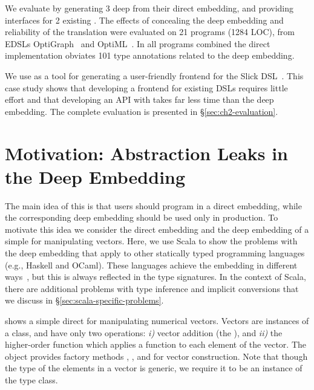 %
%
We evaluate \yy by generating 3 deep \edsls from their direct
embedding, and providing interfaces for 2 existing \edsls. The effects
of concealing the deep embedding and reliability of the translation
were evaluated on 21 programs (1284 LOC), from EDSLs
OptiGraph~\cite{composition-ecoop2013} and
OptiML~\cite{sujeeth_optiml:_2011}. In all programs combined the
direct implementation obviates 101 type annotations related to the
deep embedding.

We use \yy as a tool for generating a user-friendly frontend for the Slick DSL~\cite{slick}. This case study shows
that developing a frontend for existing DSLs requires little effort and that
developing an API with \yy takes far less time than the deep embedding. The complete evaluation is presented in \S \ref{sec:ch2-evaluation}.




\chapter{Motivation: Abstraction Leaks in the Deep Embedding}
\label{sec:motivation}

The main idea of this \work is that \edsl{} users should program in a
direct embedding, while the corresponding deep embedding should be used only in production.
To motivate this idea we consider the direct embedding and the deep embedding of a simple \edsl for manipulating vectors. Here, we use Scala to show the problems with the deep embedding that apply to other statically typed programming languages (e.g., Haskell and OCaml). These languages achieve the embedding in different ways~\cite{svenningsson_combining_2012,awesome,carette_finally_2009,guerrero_implementing_2004}, but this is always reflected in the type signatures. In the context of Scala, there are additional problems with type inference and implicit conversions that we discuss in \S \ref{sec:scala-specific-problems}.

 shows a simple direct \edsl{} for manipulating numerical vectors.
Vectors are instances of a  class, and have only two operations:
\emph{i)} vector addition (the \code{+}), and \emph{ii)} the higher-order  function which applies a function  to each element of the vector. The  object provides factory methods , , and  for vector construction. Note that though the type of the elements in a vector is generic, we require it to be an instance of the  type class.

